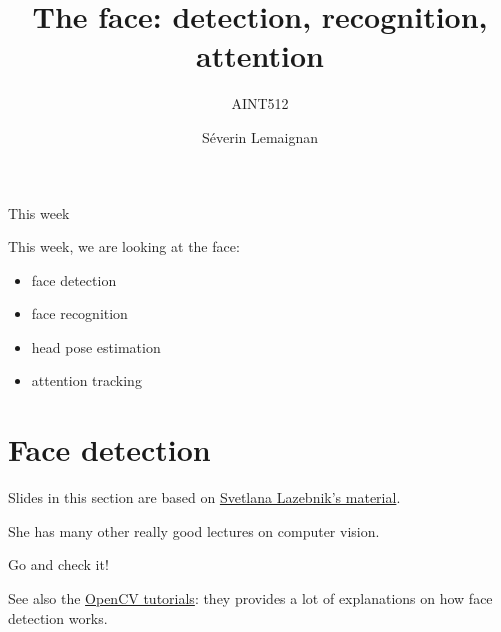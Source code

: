 \documentclass[compress]{beamer}
\title{The face: detection, recognition, attention}
\subtitle{AINT512}
\date{}
\author{Séverin Lemaignan}
\institute{Centre for Neural Systems and Robotics\\{\bf Plymouth University}}
\makeatletter
\let\beamer@writeslidentry@miniframeson=\beamer@writeslidentry
\def\beamer@writeslidentry@miniframesoff{%
  \expandafter\beamer@ifempty\expandafter{\beamer@framestartpage}{}%
  {%
    \clearpage\beamer@notesactions%
  }
}
\newcommand*{\miniframeson}{\let\beamer@writeslidentry=\beamer@writeslidentry@miniframeson}
\newcommand*{\miniframesoff}{\let\beamer@writeslidentry=\beamer@writeslidentry@miniframesoff}
\makeatother
\begin{document}
\miniframesoff


\maketitle


\begin{frame}{This week}

This week, we are looking at the face:

    \begin{itemize}
        \item face detection
        \item face recognition
        \item head pose estimation
        \item attention tracking
    \end{itemize}

\end{frame}

\miniframeson

\section{Face detection}


\begin{frame}[plain]

    Slides in this section are based on
    \href{http://slazebni.cs.illinois.edu/spring16/}{Svetlana Lazebnik's
    material}.
    
    She has many other really good lectures on computer vision.
    
    Go and check it!

    \vspace{2em}
    See also the
    \href{https://docs.opencv.org/3.3.0/d7/d8b/tutorial_py_face_detection.html}{OpenCV
    tutorials}: they provides a lot of explanations on how face detection works.
\end{frame}

\end{document}
